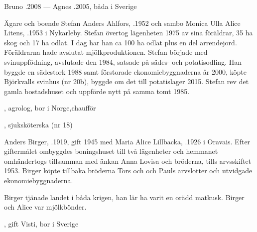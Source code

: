 Bruno .2008  ---  Agnes .2005, båda i Sverige



%



%
Ägare och boende Stefan Anders Ahlfors, .1952 och sambo Monica Ulla Alice Litens, .1953 i Nykarleby. Stefan övertog lägenheten 1975 av sina föräldrar, 35 ha skog och 17 ha odlat. I dag har han ca 100 ha odlat plus en del arrendejord. Föräldrarna hade avslutat mjölkproduktionen. Stefan började med svinuppfödning, avslutade den 1984, satsade på sädes- och potatisodling. Han byggde en sädestork 1988 samt förstorade ekonomiebyggnaderna år 2000, köpte Björkvalls svinhus (nr 20b), byggde om det till potatislager 2015.
Stefan rev det gamla bostadshuset och uppförde nytt på samma tomt 1985.
\begin{jhchildren}
  \item {}, agrolog, bor i Norge,chaufför
  \item {}, sjuksköterska (nr 18)
\end{jhchildren}



%
Anders Birger, .1919, gift 1945 med Maria Alice Lillbacka, .1926 i Oravais. Efter giftermålet ombyggdes boningshuset till två lägenheter och hemmanet omhändertogs tillsamman med änkan Anna Lovisa och bröderna, tills arvsskiftet 1953. Birger köpte tillbaka bröderna Tors och och Pauls arvslotter och utvidgade ekonomiebyggnaderna.

Birger tjänade landet i båda krigen, han lär ha varit en orädd matkusk. Birger och Alice var mjölkbönder.
\begin{jhchildren}
  \item {}, gift Visti, bor i Sverige
  \item {}
\end{jhchildren}

